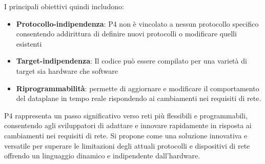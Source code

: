 I principali obiettivi quindi includono:
\begin{itemize}
    \item \textbf{Protocollo-indipendenza}: P4 non è vincolato a nessun protocollo specifico consentendo addirittura di definire nuovi protocolli o modificare quelli esistenti
    \item \textbf{Target-indipendenza}: Il codice può essere compilato per una varietà di target sia hardware che software
    \item \textbf{Riprogrammabilità}: permette di aggiornare e modificare il comportamento del dataplane in tempo reale rispondendo ai cambiamenti nei requisiti di rete.
\end{itemize}
P4 rappresenta un passo significativo verso reti più flessibili e programmabili, consentendo agli sviluppatori di adattare e innovare rapidamente in risposta ai cambiamenti nei requisiti di rete.
Si propone come una soluzione innovativa e versatile per superare le limitazioni degli attuali protocolli e dispositivi di rete offrendo un linguaggio dinamico e indipendente dall'hardware.

